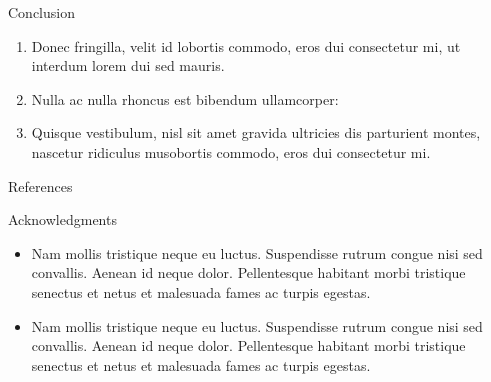 {%

\begin{block}{Conclusion}
	\begin{enumerate}
		\item Donec fringilla, velit id lobortis commodo, eros dui consectetur mi, ut interdum lorem dui sed mauris.
		\item Nulla ac nulla rhoncus est bibendum ullamcorper:
		\item Quisque vestibulum, nisl sit amet gravida ultricies dis parturient montes, nascetur ridiculus musobortis commodo, eros dui consectetur mi.
	\end{enumerate}
\end{block}
\vfill

\begin{block}{References}
	\printbibliography
\end{block}
\vfill

\begin{block}{Acknowledgments}
	
	\begin{itemize}
		\item Nam mollis tristique neque eu luctus. Suspendisse rutrum congue nisi sed convallis. Aenean id neque dolor. Pellentesque habitant morbi tristique senectus et netus et malesuada fames ac turpis egestas.
		\item Nam mollis tristique neque eu luctus. Suspendisse rutrum congue nisi sed convallis. Aenean id neque dolor. Pellentesque habitant morbi tristique senectus et netus et malesuada fames ac turpis egestas.
	\end{itemize}
	
\end{block}
}